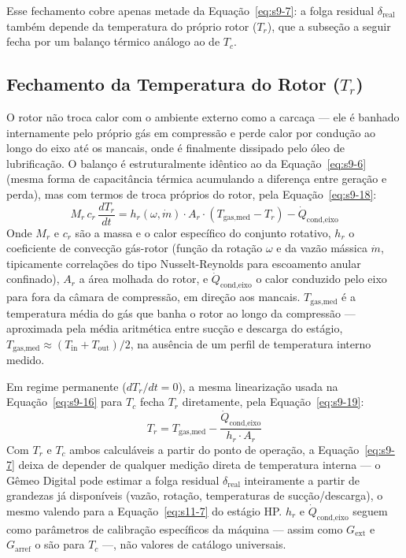 \documentclass[12pt,a4paper]{article}
\numberwithin{equation}{section}
\numberwithin{table}{section}
\numberwithin{figure}{section}
\begin{document}
	Esse fechamento cobre apenas metade da Equação~\eqref{eq:s9-7}: a folga residual $\delta_{\text{real}}$ também depende da temperatura do próprio rotor ($T_r$), que a subseção a seguir fecha por um balanço térmico análogo ao de $T_c$.

	\subsection{\textbf{Fechamento da Temperatura do Rotor ($T_r$)}}
	O rotor não troca calor com o ambiente externo como a carcaça — ele é banhado internamente pelo próprio gás em compressão e perde calor por condução ao longo do eixo até os mancais, onde é finalmente dissipado pelo óleo de lubrificação. O balanço é estruturalmente idêntico ao da Equação~\eqref{eq:s9-6} (mesma forma de capacitância térmica acumulando a diferença entre geração e perda), mas com termos de troca próprios do rotor, pela Equação~\eqref{eq:s9-18}:
	\begin{equation}\label{eq:s9-18}
 M_r \, c_r \, \frac{dT_r}{dt} = h_r(\omega, \dot{m}) \cdot A_r \cdot (T_{\text{gas,med}} - T_r) - \dot{Q}_{\text{cond,eixo}}
\end{equation}
	Onde $M_r$ e $c_r$ são a massa e o calor específico do conjunto rotativo, $h_r$ o coeficiente de convecção gás-rotor (função da rotação $\omega$ e da vazão mássica $\dot{m}$, tipicamente correlações do tipo Nusselt-Reynolds para escoamento anular confinado), $A_r$ a área molhada do rotor, e $\dot{Q}_{\text{cond,eixo}}$ o calor conduzido pelo eixo para fora da câmara de compressão, em direção aos mancais. $T_{\text{gas,med}}$ é a temperatura média do gás que banha o rotor ao longo da compressão — aproximada pela média aritmética entre sucção e descarga do estágio, $T_{\text{gas,med}} \approx (T_{\text{in}} + T_{\text{out}})/2$, na ausência de um perfil de temperatura interno medido.

	Em regime permanente ($dT_r/dt = 0$), a mesma linearização usada na Equação~\eqref{eq:s9-16} para $T_c$ fecha $T_r$ diretamente, pela Equação~\eqref{eq:s9-19}:
	\begin{equation}\label{eq:s9-19}
 T_r = T_{\text{gas,med}} - \frac{\dot{Q}_{\text{cond,eixo}}}{h_r \cdot A_r}
\end{equation}
	Com $T_r$ e $T_c$ ambos calculáveis a partir do ponto de operação, a Equação~\eqref{eq:s9-7} deixa de depender de qualquer medição direta de temperatura interna — o Gêmeo Digital pode estimar a folga residual $\delta_{\text{real}}$ inteiramente a partir de grandezas já disponíveis (vazão, rotação, temperaturas de sucção/descarga), o mesmo valendo para a Equação~\eqref{eq:s11-7} do estágio HP. $h_r$ e $\dot{Q}_{\text{cond,eixo}}$ seguem como parâmetros de calibração específicos da máquina — assim como $G_{\text{ext}}$ e $G_{\text{arref}}$ o são para $T_c$ —, não valores de catálogo universais.
\end{document}

